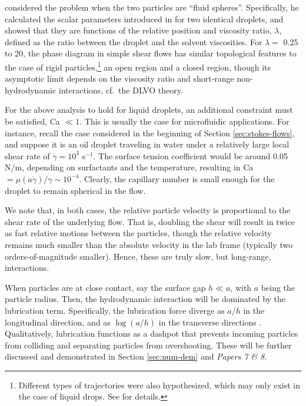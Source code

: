 \cite{Zinchenko1983,Zinchenko1984} considered the problem when the two particles are ``fluid spheres''.
Specifically, he calculated the scalar parameters introduced in \cite{batchelor_green_1972} for two identical droplets, and showed that they are functions of the relative position and viscosity ratio, $\lambda$, defined as the ratio between the droplet and the solvent viscosities.
For $\lambda=$ 0.25 to 20, the phase diagram  in simple shear flows has similar topological features to the case of rigid particles,\footnote{Different types of trajectories were also hypothesized, which may only exist in the case of liquid drops. See \cite{Zinchenko1984} for details.} \ie an open region and a closed region, though its asymptotic limit depends on the viscosity ratio and short-range non-hydrodynamic interactions, cf.\ the DLVO theory.

For the above analysis to hold for liquid droplets, an additional constraint must be satisfied, \ie Ca $\ll 1$.
This is usually the case for microfluidic applications. For instance, recall the case considered in the beginning of Section \ref{sec:stokes-flows}, and suppose it is an oil droplet traveling in water under a relatively large local shear rate of $\dot{\gamma}=10^3$ s$^{-1}$. The surface tension coefficient would be around 0.05 N/m, depending on surfactants and the temperature, resulting in Ca $=\mu(a\dot{\gamma})/\gamma \sim 10^{-4}$. Clearly, the capillary number is small enough for the droplet to remain spherical in the flow.

We note that, in both cases, the relative particle velocity is proportional to the shear rate of the underlying flow. That is, doubling the shear will result in twice as fast relative motions between the particles, though the relative velocity remains much smaller than the absolute velocity in the lab frame (typically two orders-of-magnitude smaller). Hence, these are truly slow, but long-range, interactions.

When particles are at close contact, say the surface gap $h \ll a$, with $a$ being the particle radius. Then, the hydrodynamic interaction will be dominated by the lubrication term. Specifically, the lubrication force diverge as $a/h$ in the longitudinal direction, and as $\log(a/h)$ in the transverse directions \citep{jeffrey_onishi_1984}. Qualitatively, lubrication functions as a dashpot that prevents incoming particles from colliding and separating particles from overshooting. These will be further discussed and demonstrated in Section \ref{sec:num-dem} and \emph{Papers 7 \& 8}.


